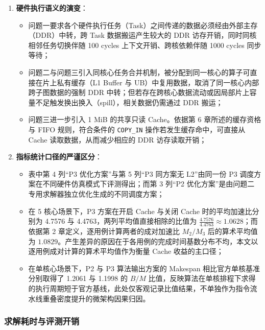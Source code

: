 \documentclass[anonymous,withtoc]{gmcm2026}
\providecommand{\tightlist}{\setlength{\itemsep}{0pt}\setlength{\parskip}{0pt}}
\begin{document}
\begin{enumerate}
\def\labelenumi{\arabic{enumi}.}
\tightlist
\item
  \textbf{硬件执行语义的演变}：

  \begin{itemize}
  \tightlist
  \item
    问题一要求各个硬件执行任务（Task）之间传递的数据必须经由外部主存（DDR）中转，跨 Task 数据搬运产生较大的 DDR 访存开销，同时同核相邻任务切换伴随 100 cycles 上下文开销、跨核依赖伴随 1000 cycles 同步等待；
  \item
    问题二与问题三引入同核心任务合并机制，被分配到同一核心的算子可直接在片上私有缓存（L1 Buffer 与 UB）中复用数据，取消了同一核心内部跨子图数据的强制 DDR 中转；但若存在跨核心数据流动或因局部片上容量不足触发换出换入（spill），相关数据仍需通过 DDR 搬运；
  \item
    问题三进一步引入 1 MiB 的共享只读 Cache。依据第 6 章所述的缓存资格与 FIFO 规则，符合条件的 \texttt{COPY\_IN} 操作若发生缓存命中，可直接从 Cache 读取数据，从而减少相应的 DDR 访存读取开销；
  \end{itemize}
\item
  \textbf{指标统计口径的严谨区分}：

  \begin{itemize}
  \tightlist
  \item
    表中第 4 列``P3 优化方案''与第 5 列``P3 同方案无 L2''由同一份 P3 调度方案在不同硬件仿真模式下评测得出；而第 3 列``P2 优化方案''是由问题二专用求解器独立优化生成的不同调度方案；
  \item
    在 5 核心场景下，P3 方案在开启 Cache 与关闭 Cache 时的平均加速比分别为 4.7576 与 4.4763，两列平均值直接相除的比值为 \(\frac{4.7576}{4.4763} \approx 1.0628\)；而依据第 2 章定义，逐用例计算两者的成对加速比 \(M_2/M_3\) 后的算术平均值为 \(1.0829\)。产生差异的原因在于各用例的完成时间基数分布不均，本文以逐用例成对计算的算术平均值作为衡量 Cache 收益的主口径；
  \item
    在单核心场景下，P2 与 P3 算法输出方案的 Makespan 相比官方单核基准分别取得了 1.2061 与 1.1998 的 \(B/M\) 比值，反映算法在单核排程下求得的执行周期短于官方基线，此处仅客观记录比值结果，不单独作为指令流水线重叠密度提升的微架构因果归因。
  \end{itemize}
\end{enumerate}

\subsubsection{求解耗时与评测开销}
\end{document}
